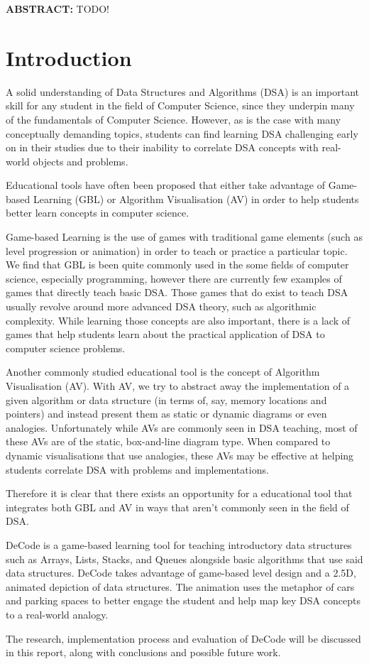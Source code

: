 \documentclass[10pt]{article}
\begin{document}
\noindent \textbf{ABSTRACT:} TODO!

\section{Introduction}
A solid understanding of Data Structures and Algorithms (DSA) is an important skill for any student in the field of Computer Science, since they underpin many of the fundamentals of Computer Science. However, as is the case with many conceptually demanding topics, students can find learning DSA challenging early on in their studies\cite{7600449} due to their inability to correlate DSA concepts with real-world objects and problems.\par
Educational tools have often been proposed that either take advantage of Game-based Learning (GBL) or Algorithm Visualisation (AV) in order to help students better learn concepts in computer science.\par
Game-based Learning is the use of games with traditional game elements (such as level progression or animation) in order to teach or practice a particular topic\cite{GBLTeaching}. We find that GBL is been quite commonly used in the some fields of computer science, especially programming, however there are currently few examples of games that directly teach basic DSA. Those games that do exist to teach DSA usually revolve around more advanced DSA theory, such as algorithmic complexity. While learning those concepts are also important, there is a lack of games that help students learn about the practical application of DSA to computer science problems.\par
Another commonly studied educational tool is the concept of Algorithm Visualisation (AV). With AV, we try to abstract away the implementation of a given algorithm or data structure (in terms of, say, memory locations and pointers) and instead present them as static or dynamic diagrams or even analogies. Unfortunately while AVs are commonly seen in DSA teaching, most of these AVs are of the static, box-and-line diagram type\cite{Esponda-Arguero:2010:TVD:1827707.1827710}. When compared to dynamic visualisations that use analogies, these AVs may be effective at helping students correlate DSA with problems and implementations.\par
Therefore it is clear that there exists an opportunity for a educational tool that integrates both GBL and AV in ways that aren't commonly seen in the field of DSA.\par
DeCode is a game-based learning tool for teaching introductory data structures such as Arrays, Lists, Stacks, and Queues alongside basic algorithms that use said data structures. DeCode takes advantage of game-based level design and a 2.5D, animated depiction of data structures. The animation uses the metaphor of cars and parking spaces to better engage the student and help map key DSA concepts to a real-world analogy.\par
The research, implementation process and evaluation of DeCode will be discussed in this report, along with conclusions and possible future work.
\end{document}
